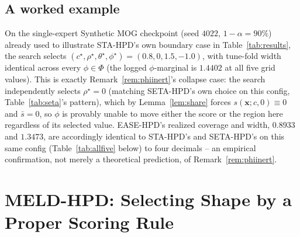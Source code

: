 \documentclass[10pt,twocolumn,a4paper]{article}
\begin{document}
\subsection{A worked example}
On the single-expert Synthetic MOG checkpoint (seed $4022$, $1-\alpha=90\%$) already used to
illustrate STA-HPD's own boundary case in Table~\ref{tab:results}, the search selects
$(c^\star,\rho^\star,\theta^\star,\phi^\star)=(0.8,0,1.5,-1.0)$, with tune-fold width identical across
every $\phi\in\Phi$ (the logged $\phi$-marginal is $1.4402$ at all five grid values). This is exactly
Remark~\ref{rem:phiinert}'s collapse case: the search independently selects $\rho^\star=0$ (matching
SETA-HPD's own choice on this config, Table~\ref{tab:seta}'s pattern), which by
Lemma~\ref{lem:share} forces $s(\bm x;c,0)\equiv0$ and $\bar s=0$, so $\phi$ is provably unable to move
either the score or the region here regardless of its selected value. EASE-HPD's realized coverage
and width, $0.8933$ and $1.3473$, are accordingly identical to STA-HPD's and SETA-HPD's on this same
config (Table~\ref{tab:allfive} below) to four decimals -- an empirical confirmation, not merely a
theoretical prediction, of Remark~\ref{rem:phiinert}.

\section{MELD-HPD: Selecting Shape by a Proper Scoring Rule}
\label{sec:meld}
\end{document}
